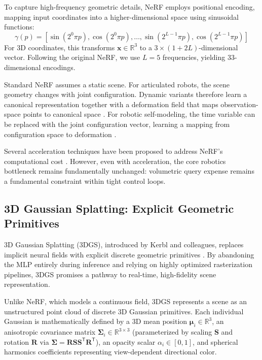 \documentclass[12pt,a4paper,oneside]{report}
\begin{document}
To capture high-frequency geometric details, NeRF employs positional encoding, mapping input coordinates into a higher-dimensional space using sinusoidal functions:
\begin{equation}
\gamma(p) = [\sin(2^0 \pi p), \cos(2^0 \pi p), \ldots, \sin(2^{L-1} \pi p), \cos(2^{L-1} \pi p)]
\end{equation}
For 3D coordinates, this transforms $\mathbf{x} \in \mathbb{R}^3$ to a $3 \times (1 + 2L)$-dimensional vector. Following the original NeRF, we use $L = 5$ frequencies, yielding 33-dimensional encodings.

Standard NeRF assumes a static scene. For articulated robots, the scene geometry changes with joint configuration. Dynamic variants therefore learn a canonical representation together with a deformation field that maps observation-space points to canonical space \cite{pumarola2021d, park2021nerfies}. For robotic self-modeling, the time variable can be replaced with the joint configuration vector, learning a mapping from configuration space to deformation \cite{hu2024teaching}.

Several acceleration techniques have been proposed to address NeRF's computational cost \cite{muller2022instant, barron2021mip, barron2023zipnerf}. However, even with acceleration, the core robotics bottleneck remains fundamentally unchanged: volumetric query expense remains a fundamental constraint within tight control loops.

\subsection{3D Gaussian Splatting: Explicit Geometric Primitives}

3D Gaussian Splatting (3DGS), introduced by Kerbl and colleagues, replaces implicit neural fields with explicit discrete geometric primitives \cite{kerbl20233d}. By abandoning the MLP entirely during inference and relying on highly optimized rasterization pipelines, 3DGS promises a pathway to real-time, high-fidelity scene representation.

Unlike NeRF, which models a continuous field, 3DGS represents a scene as an unstructured point cloud of discrete 3D Gaussian primitives. Each individual Gaussian is mathematically defined by a 3D mean position $\boldsymbol{\mu}_i \in \mathbb{R}^3$, an anisotropic covariance matrix $\boldsymbol{\Sigma}_i \in \mathbb{R}^{3 \times 3}$ (parameterized by scaling $\mathbf{S}$ and rotation $\mathbf{R}$ via $\boldsymbol{\Sigma} = \mathbf{R} \mathbf{S} \mathbf{S}^\mathsf{T} \mathbf{R}^\mathsf{T}$), an opacity scalar $\alpha_i \in [0, 1]$, and spherical harmonics coefficients representing view-dependent directional color.
\end{document}
